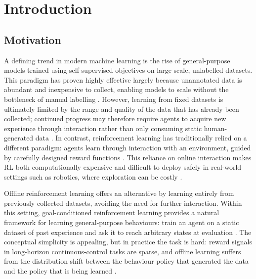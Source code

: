 \chapter{Introduction}

\section{Motivation}
A defining trend in modern machine learning is the rise of
general-purpose models trained using self-supervised objectives on
large-scale, unlabelled datasets. This paradigm has proven highly
effective largely because unannotated data is abundant and
inexpensive to collect, enabling models to scale without the
bottleneck of manual labelling
\cite{devlin2019bertpretrainingdeepbidirectional, chen2020simpleframeworkcontrastivelearning, he2021maskedautoencodersscalablevision}.
However, learning from fixed datasets is ultimately limited by the range
and quality of the data that has already been collected; continued
progress may therefore require agents to acquire new experience through
interaction rather than only consuming static human-generated data
\cite{SilverSutton2025}. In contrast, reinforcement learning
has traditionally relied on a different paradigm: agents learn
through interaction with an environment, guided by carefully
designed reward functions \cite{sutton2018reinforcement}. This reliance on online interaction
makes RL both computationally expensive and difficult to deploy
safely in real-world settings such as robotics, where exploration
can be costly \cite{kober2013reinforcement,dulacarnold2019challengesrealworldreinforcementlearning}.

Offline reinforcement learning offers an alternative by learning
entirely from previously collected datasets, avoiding the need for
further interaction. Within this setting, goal-conditioned
reinforcement learning provides a natural framework for learning
general-purpose behaviours: train an agent on a static dataset of
past experience and ask it to reach arbitrary states at evaluation
\cite{Kaelbling1993LearningTA, pmlr-v37-schaul15, ogbench_park2025}.
The conceptual simplicity is appealing, but in practice the task is hard:
reward signals in long-horizon continuous-control tasks are sparse,
and offline learning suffers from the distribution shift between
the behaviour policy that generated the data and the policy that
is being learned \cite{levine2020offlinereinforcementlearningtutorial}.

